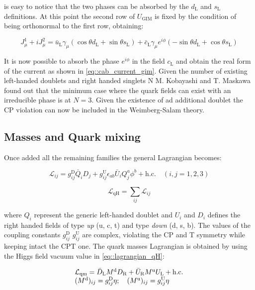 is easy to notice that the two phases can be absorbed by the $d_{\text{L}}$ and $s_{\text{L}}$ definitions. At this point the second row of $U_{\text{GIM}}$ is fixed by the condition of being orthonormal to the first row, obtaining:

\begin{equation}
J^{1}_{\mu} + i J^{2}_{\mu} =  \bar{u}_{\text{L}}\gamma_{\mu} \left(\cos\theta d_{\text{L}} +\sin\theta s_{\text{L}}\right) + \bar{c}_{\text{L}}\gamma_{\mu}e^{i\phi} (-\sin\theta d_{\text{L}} + \cos\theta s_{\text{L}})
\end{equation}

It is now possible to absorb the phase $e^{i\phi}$ in the field $c_{\text{L}}$ and obtain the real form of the current as shown in \autoref{eq::cab_current_gim}. Given the number of existing left-handed doublets and right handed singlets N M. Kobayashi and T. Maskawa found out that the minimum case where the quark fields can exist with an irreducible phase is at $N = 3$. Given the existence of ad additional doublet the CP violation can now be included in the Weimberg-Salam theory.

\subsection{Masses and Quark mixing}

Once added all the remaining families the general Lagrangian becomes:

\begin{equation}
\mathcal{L}_{ij} = g^{\text{D}}_{ij}\bar{Q}_{i}D_{j} + g^{\text{U}}_{ij}\epsilon_{ab}\bar{U}_{i}Q^{a}_{j}\phi^{b} + \text{h.c.} \quad (i,j = 1,2,3)
\end{equation}

\begin{equation}
\mathcal{L}_{\text{qH}} = \sum_{ij}\mathcal{L}_{ij}
\label{eq::lagrangian_qH}
\end{equation}

where $Q_{i}$ represent the generic left-handed doublet and $U_{i}$ and $D_{i}$ defines the right handed fields of type \textit{up} (u, c, t) and type \textit{down} (d, s, b). The values of the coupling constants $g^{\text{D}}_{ij}$ $g^{\text{U}}_{ij}$ are complex, violating the CP and T symmetry while keeping intact the CPT one.
The quark masses Lagrangian is obtained by using the Higgs field vacuum value in \autoref{eq::lagrangian_qH}:

\begin{equation}
\begin{array}{l c l}
\mathcal{L}_{\text{qm}} = \bar{D}_{\text{L}}M^{\text{d}}D_{\text{R}} + \bar{U}_{\text{R}}M^{\text{u}}U_{\text{L}} + \text{h.c.} \\
(M^{\text{d}})_{ij} = g^{\text{D}}_{ij}\eta; \quad (M^{\text{u}})_{ij} = g^{\text{U}}_{ij}\eta
\end{array}
\end{equation}

